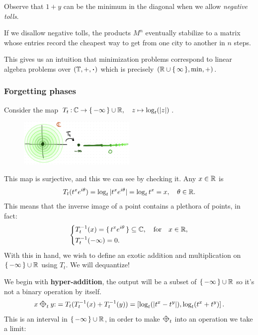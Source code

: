 \documentclass[12pt]{memoir}
\newcommand{\diamondplus}{\mathbin{\rotatebox[origin=c]{45}{$\boxtimes$}}} %
\theoremstyle{definition}
\begin{document}
Observe that $1+y$ can be the minimum in the diagonal when we allow \emph{negative tolls}.
\begin{Rmk}
If we disallow negative tolls, the products $M^n$ eventually stabilize to a matrix whose entries record the cheapest way to get from one city to another in $n$ steps.
\end{Rmk}
This gives us an intuition that minimization problems correspond to linear algebra problems over $(\bT,+,\.)$ which is precisely $(\mathbb{R}\cup\{\,\infty\,\},\min,+)$.

\subsubsection{Forgetting phases}

Consider the map $T_t\mathbin{:}\mathbb{C}\to\{\,-\infty\,\}\cup\mathbb{R},\quad z\mapsto\log_t(|z|)$.
\begin{figure}[h!]
    \centering
    \includegraphics[width=0.5\textwidth]{figs/fig1-3.png}
\end{figure}
This map is surjective, and this we can see by checking it. Any $x\in\mathbb{R}$ is 
$$T_t(t^xe^{i\theta})=\log_t|t^xe^{i\theta}|=\log_tt^x=x,\quad\theta\in\mathbb{R}.$$
This means that the inverse image of a point contains a plethora of points, in fact:
$$
\left\lbrace
\begin{aligned}
    &T_t^{-1}(x)=\{\,t^xe^{i\theta}\,\}\subseteq\mathbb{C},\quad\text{for}\quad x\in\mathbb{R},\\
    &T_t^{-1}(-\infty)=0.
\end{aligned}
\right.
$$
With this in hand, we wish to define an exotic addition and multiplication on $\{\,-\infty\,\}\cup\mathbb{R}$ using $T_t$. We will dequantize!\par 
We begin with \textbf{hyper-addition}, the output will be a subset of $\{\,-\infty\,\}\cup\mathbb{R}$ so it's not a binary operation by itself. 
$$x\diamondplus_t y\:= T_t(T_t^{-1}(x)+T_t^{-1}(y))=\bonj{\log_t(|t^x-t^y|),\log_t(t^x+t^y)}.\label{problem1-hyperAddition}$$
This is an interval in $\{\,-\infty\,\}\cup\mathbb{R}$, in order to make $\diamondplus_t$ into an operation we take a limit:
\end{document}
